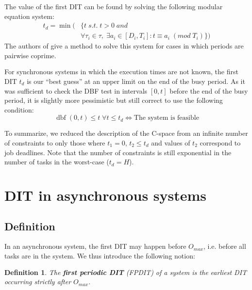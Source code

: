 \documentclass[conference]{IEEEtran}
\newtheorem{definition}{Definition}
\newcommand{\dbf}[1]{\operatorname{dbf}(#1)}
\begin{document}
		The value of the first DIT can be found by solving the following modular
		equation system:
		\begin{equation}
			\begin{split}
				 t_d = \min(& \{ t \; s.t. \; t > 0 \; and \\
						& \forall \tau_i \in \tau, \; \exists a_i \in [D_i, T_i]: t \equiv a_i \;
						(mod \; T_i) \})
			\end{split}
		\end{equation}
  The authors of \cite{george2009characterization} give a method to solve this system for cases in which periods are pairwise coprime.

  For synchronous systems in which the execution times are not known, the first DIT $t_d$
  is our ``best guess'' at an upper limit on the end of the busy period. As it was sufficient
  to check the DBF test in intervals $[0, t]$ before the end of the busy period, it is
  slightly more pessimistic but still correct to use the following condition:
  \begin{equation}
  		\dbf{0,t} \leqslant t \; \forall t \leqslant t_d
  		\iff \text{The system is feasible}
  \end{equation}

  To summarize, we reduced the description of the C-space from an infinite number
  of constraints to only those where $t_1 = 0$, $t_2 \leqslant t_d$ and
  values of $t_2$ correspond to job deadlines. Note that the number of
  constraints is still exponential in the number of tasks in the worst-case ($t_d = H$).

\section{DIT in asynchronous systems}
  \label{sct:asyncDIT}

  \subsection{Definition}

    In an asynchronous system, the first DIT may happen before $O_{max}$, i.e. before all tasks are in the system. We thus introduce the following notion:

    \begin{definition}
      The \textbf{first periodic DIT} (FPDIT) of a system is the earliest DIT occurring
      strictly after $O_{max}$.
    \end{definition}
\end{document}
